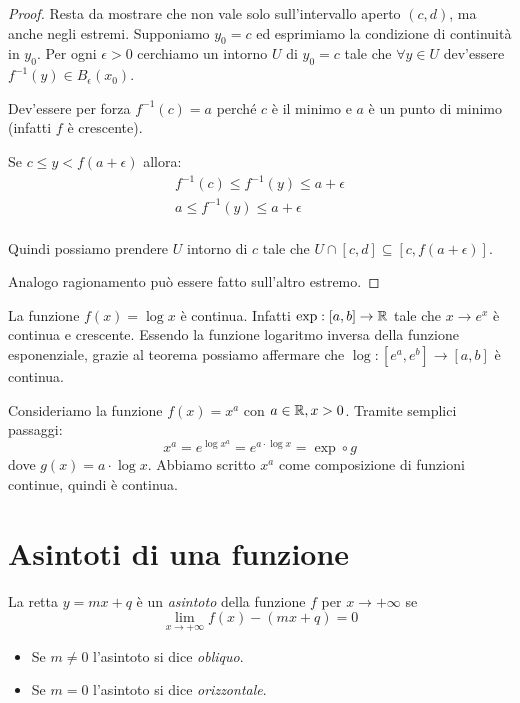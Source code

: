 \begin{proof}
Resta da mostrare che non vale solo sull'intervallo aperto $(c, d)$, ma anche negli estremi. Supponiamo $y_0 = c$ ed esprimiamo la condizione di continuità in $y_0$. Per ogni $\epsilon > 0$ cerchiamo un intorno $U$ di $y_0 = c$ tale che $\forall y \in U$ dev'essere $f^{-1} (y) \in B_\epsilon (x_0)$.

Dev'essere per forza $f^{-1} (c) = a$ perché $c$ è il minimo e $a$ è un punto di minimo (infatti $f$ è crescente).

Se $c \le y < f(a + \epsilon)$ allora:
\begin{gather*}
f^{-1} (c) \le f^{-1} (y) \le a + \epsilon \\
a \le f^{-1} (y) \le a + \epsilon \\
\end{gather*}

Quindi possiamo prendere $U$ intorno di $c$ tale che $U \cap [c,d] \subseteq [c, f(a+\epsilon)]$.

Analogo ragionamento può essere fatto sull'altro estremo.
\end{proof}

\begin{example}
La funzione $f(x) = \log x$ è continua. Infatti $\exp : [a, b] \to \mathbb R$ tale che $x \to e^x$ è continua e crescente. Essendo la funzione logaritmo inversa della funzione esponenziale, grazie al teorema possiamo affermare che $\log : [e^a, e^b] \to [a, b]$ è continua.
\end{example}

\begin{example}
Consideriamo la funzione $f(x) = x^a$ con $a \in \mathbb R, x > 0$. Tramite semplici passaggi:
\begin{equation*}
x^a = e^{\log {x^a}} = e^{a \cdot \log x} = \exp \circ g
\end{equation*}
dove $g(x) = a \cdot \log x$.
Abbiamo scritto $x^a$ come composizione di funzioni continue, quindi è continua.
\end{example}

\section{Asintoti di una funzione}
\begin{definition}
La retta $y = mx + q$ è un \emph{asintoto} della funzione $f$ per $x \to +\infty$ se
\begin{equation*}
\lim_{x \to +\infty} f(x) - (mx + q) = 0
\end{equation*}
\begin{itemize}
\item Se $m \neq 0$ l'asintoto si dice \emph{obliquo}.
\item Se $m = 0$ l'asintoto si dice \emph{orizzontale}.
\end{itemize}
\end{definition}

